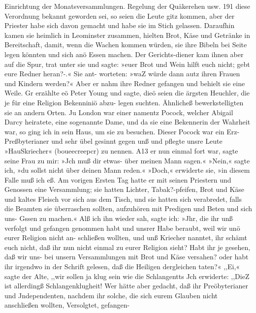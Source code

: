 Einrichtung der Monatsversammlungen. Regelung der Quäkerehen usw. 191
diese Verordnung bekannt geworden sei, so seien die Leute gitz
kommen, aber der Priester habe sich davon gemacht und habe sie
im Stich gelassen. Daraufhin kamen sie heimlich in Leominster
zusammen, hielten Brot, Käse und Getränke in Bereitschaft, damit,
wenn die Wachen kommen würden, sie ihre Bibeln bei Seite legen
könnten und sich anö Essen machen. Der Gerichts-diener kam
ihnen aber auf die Spur, trat unter sie und sagte: »euer Brot
und Wein hilft euch nicht; gebt eure Redner heran?-.« Sie ant-
worteten: »waZ würde dann autz ihren Frauen und Kindern
werden?« Aber er nahm ihre Redner gefangen und behielt sie
eine Weile. Gr erzählte eö Peter Young und sagte, dieö seien
die ärgsten Heuchler, die je für eine Religion Bekenniniö abzu-
legen suchten.
Ähnlicheß bewerkstelligten sie an andern Orten. Ju London
war einer namentz Pocock, welcher Abigail Darcy heiratete, eine
sogenannte Dame, und da sie eine Bekennerin der Wahrheit war,
so ging ich in sein Haus, um sie zu besuchen. Dieser Pocock
war ein Erz-Preßbyterianer und sehr übel gesinnt gegen unß
und pflegte unsre Leute »HauSkriecher« (boueecreepcr) zu nennen.
A13 er nun einmal fort war, sagte seine Frau zu mir: »Jch muß
dir etwas- über meinen Mann sagen.« »Nein,« sagte ich, »du
sollst nicht über deinen Mann reden.« »Doch,« erwiderte sie,
»in diesem Falle muß ich eß. Am vorigen Ersten Tag hatte
er mit seinen Priestern und Genossen eine Versammlung; sie hatten
Lichter, Tabak?-pfeifen, Brot und Käse und kaltes Fleisch vor sich
aus dem Tisch, und sie hatten sich verabredet, falls die Beamten
sie überraschen sollten, aufzuhören mit Predigen und Beten und
sich uns- Gssen zu machen.« Alß ich ihn wieder sah, sagte ich:
»Jhr, die ihr unß verfolgt und gefangen genommen habt und
unsrer Habe beraubt, weil wir unö eurer Religion nicht an-
schließen wollten, und unß Kriecher nanntet, ihr schämt euch nicht,
daß ihr nun nicht einmal zu eurer Religion sieht? Habt ihr je
gesehen, daß wir uns- bei unsern Versammlungen mit Brot und
Käse versahen? oder habt ihr irgendwo in der Schrift gelesen,
daß die Heiligen dergleichen taten?« ,,Ei,« sagte der Alte, ,,wir
sollen ja klug sein wie die Schlangentts Jch erwiderte: ,,DieZ
ist allerdingß Schlangenklugheit! Wer hätte aber gedacht, daß
ihr Preöbyterianer und Jndependenten, nachdem ihr solche, die
sich eurem Glauben nicht anschließen wollten, Versolgtet, gefangen-


